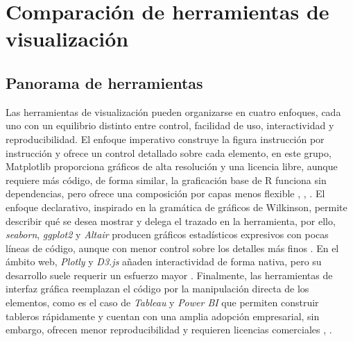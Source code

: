 \section{Comparación de herramientas de visualización}
\label{tools_comparison}
    \subsection{Panorama de herramientas}
    \label{tools_overview}
        Las herramientas de visualización pueden organizarse en cuatro enfoques,
        cada uno con un equilibrio distinto entre control, facilidad de uso,
        interactividad y reproducibilidad. El enfoque imperativo construye la 
        figura instrucción por instrucción y ofrece un control detallado sobre 
        cada elemento, en este grupo, Matplotlib proporciona gráficos de alta 
        resolución y una licencia libre, aunque requiere más código, de forma 
        similar, la graficación base de R funciona sin dependencias, pero ofrece 
        una composición por capas menos flexible \cite{castro2026ciencia}, 
        \cite{wilkinson2005grammar}, \cite{hunter2007matplotlib}. El enfoque 
        declarativo, inspirado en la gramática de gráficos de Wilkinson, 
        permite describir qué se desea mostrar y delega el trazado en la 
        herramienta, por ello, \textit{seaborn}, \textit{ggplot2} y 
        \textit{Altair} producen gráficos estadísticos expresivos con pocas 
        líneas de código, aunque con menor control sobre los detalles más 
        finos \cite{wilkinson2005grammar}. En el ámbito web, \textit{Plotly} 
        y \textit{D3.js} añaden interactividad de forma nativa, pero su desarrollo 
        suele requerir un esfuerzo mayor \cite{castro2026ciencia}. Finalmente, 
        las herramientas de interfaz gráfica reemplazan el código por la
        manipulación directa de los elementos, como es el caso de \textit{Tableau} 
        y \textit{Power BI} que permiten construir tableros rápidamente y 
        cuentan con una amplia adopción empresarial, sin embargo, ofrecen menor 
        reproducibilidad y requieren licencias comerciales \cite{castro2026ciencia}, 
        \cite{hunter2007matplotlib}.

